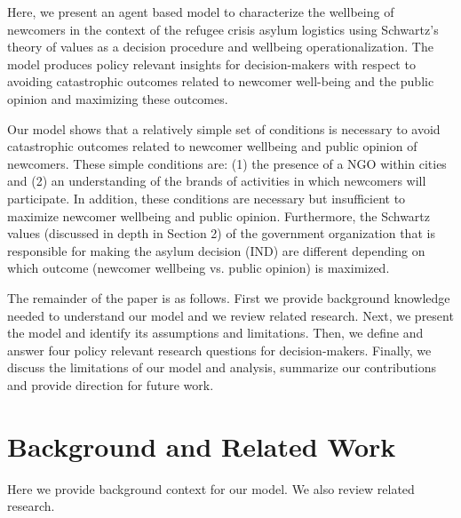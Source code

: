 \documentclass{scspaperproc}
\theoremstyle{scsthe}
\begin{document}

Here, we present an agent based model to characterize the wellbeing of newcomers in the context of the refugee crisis asylum logistics using Schwartz's theory of values as a decision procedure and wellbeing operationalization. The model produces policy relevant insights for decision-makers with respect to avoiding catastrophic outcomes related to newcomer well-being and the public opinion and maximizing these outcomes.

Our model shows that a relatively simple set of conditions is necessary to avoid catastrophic outcomes related to newcomer wellbeing and public opinion of newcomers. These simple conditions are: (1) the presence of a NGO within cities and (2) an understanding of the brands of activities in which newcomers will participate. In addition, these conditions are necessary but insufficient to maximize newcomer wellbeing and public opinion. Furthermore, the Schwartz values (discussed in depth in Section 2) of the government organization that is responsible for making the asylum decision (IND) are different depending on which outcome (newcomer wellbeing vs. public opinion) is maximized. 

The remainder of the paper is as follows. First we provide background knowledge needed to understand our model and we review related research. Next, we present the model and identify its assumptions and limitations. Then, we define and answer four policy relevant research questions for decision-makers. Finally, we discuss the limitations of our model and analysis, summarize our contributions and provide direction for future work.

\section{Background and Related Work}
Here we provide background context for our model. We also review related research.
\end{document}
